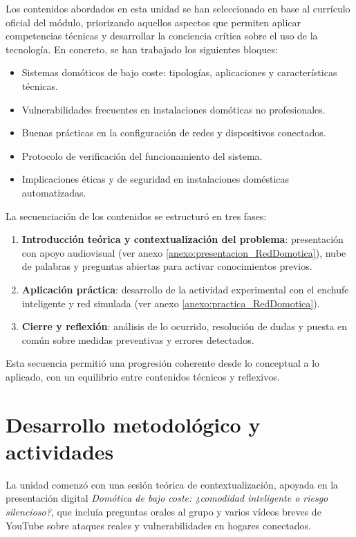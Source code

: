 Los contenidos abordados en esta unidad se han seleccionado en base al currículo oficial del módulo, priorizando aquellos aspectos que permiten aplicar competencias técnicas y desarrollar la conciencia crítica sobre el uso de la tecnología. En concreto, se han trabajado los siguientes bloques:

\begin{itemize}
  \item Sistemas domóticos de bajo coste: tipologías, aplicaciones y características técnicas.
  \item Vulnerabilidades frecuentes en instalaciones domóticas no profesionales.
  \item Buenas prácticas en la configuración de redes y dispositivos conectados.
  \item Protocolo de verificación del funcionamiento del sistema.
  \item Implicaciones éticas y de seguridad en instalaciones domésticas automatizadas.
\end{itemize}

La secuenciación de los contenidos se estructuró en tres fases: 

\begin{enumerate}
  \item \textbf{Introducción teórica y contextualización del problema}: presentación con apoyo audiovisual (ver anexo \ref{anexo:presentacion_RedDomotica}), nube de palabras y preguntas abiertas para activar conocimientos previos.
  \item \textbf{Aplicación práctica}: desarrollo de la actividad experimental con el enchufe inteligente y red simulada (ver anexo \ref{anexo:practica_RedDomotica}).
  \item \textbf{Cierre y reflexión}: análisis de lo ocurrido, resolución de dudas y puesta en común sobre medidas preventivas y errores detectados.
\end{enumerate}

Esta secuencia permitió una progresión coherente desde lo conceptual a lo aplicado, con un equilibrio entre contenidos técnicos y reflexivos.


\section{Desarrollo metodológico y actividades}

La unidad comenzó con una sesión teórica de contextualización, apoyada en la presentación digital \textit{Domótica de bajo coste: ¿comodidad inteligente o riesgo silencioso?}, que incluía preguntas orales al grupo y varios vídeos breves de YouTube sobre ataques reales y vulnerabilidades en hogares conectados.

